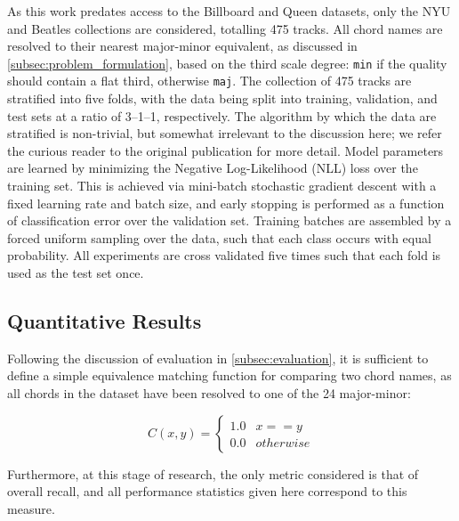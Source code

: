 As this work predates access to the Billboard and Queen datasets, only the NYU and Beatles collections are considered, totalling 475 tracks.
All chord names are resolved to their nearest major-minor equivalent, as discussed in \ref{subsec:problem_formulation}, based on the third scale degree: \texttt{min} if the quality should contain a flat third, otherwise \texttt{maj}.
The collection of 475 tracks are stratified into five folds, with the data being split into training, validation, and test sets at a ratio of 3--1--1, respectively.
The algorithm by which the data are stratified is non-trivial, but somewhat irrelevant to the discussion here; we refer the curious reader to the original publication for more detail.
Model parameters are learned by minimizing the Negative Log-Likelihood (NLL) loss over the training set.
This is achieved via mini-batch stochastic gradient descent with a fixed learning rate and batch size, and early stopping is performed as a function of classification error over the validation set.
Training batches are assembled by a forced uniform sampling over the data, such that each class occurs with equal probability.
All experiments are cross validated five times such that each fold is used as the test set once.


\subsection{Quantitative Results}
\label{subsec:quantitative_results}

Following the discussion of evaluation in \ref{subsec:evaluation}, it is sufficient to define a simple equivalence matching function for comparing two chord names, as all chords in the dataset have been resolved to one of the 24 major-minor:

\begin{displaymath}
   C(x, y) = \left\{
     \begin{array}{lr}
       1.0 & x == y \\
       0.0 & otherwise
     \end{array}
   \right.
\end{displaymath}

\noindent Furthermore, at this stage of research, the only metric considered is that of overall recall, and all performance statistics given here correspond to this measure.


